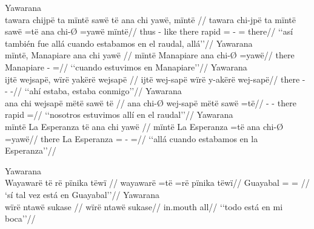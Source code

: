 \documentclass{memoir}
\begin{document}
\pex\label{loc-aff-locpred-cop-nsubj}    \a Yawarana\\
    \label{convfemgrme-99}        \begingl
        \glpreamble tawara chijpë ta mïntë sawë të ana chi yawë, mïntë //
        \gla tawara chi-jpë ta mïntë sawë =të ana chi-Ø =yawë mïntë//
        \glb thus - like there rapid =  - = there//
            \glft ‘‘así también fue allá cuando estabamos en el raudal, allá’’//  
        \endgl 
    \a Yawarana\\
    \label{convfemgrme-157}        \begingl
        \glpreamble mïntë, Manapiare ana chi yawë //
        \gla mïntë Manapiare ana chi-Ø =yawë//
        \glb there Manapiare  - =//
            \glft ‘‘cuando estuvimos en Manapiare’’//  
        \endgl 
    \a Yawarana\\
    \label{convfemgrme-292}        \begingl
        \glpreamble ijtë wejsapë, wïrë yakërë wejsapë //
        \gla ijtë wej-sapë wïrë y-akërë wej-sapë//
        \glb there -  - -//
            \glft ‘‘ahí estaba, estaba conmigo’’//  
        \endgl 
    \a Yawarana\\
    \label{histgrme-107}        \begingl
        \glpreamble ana chi wejsapë mëtë sawë të //
        \gla ana chi-Ø wej-sapë mëtë sawë =të//
        \glb {} - - there rapid =//
            \glft ‘‘nosotros estuvimos allí en el raudal’’//  
        \endgl 
    \a Yawarana\\
    \label{convamgu-127}        \begingl
        \glpreamble mïntë La Esperanza të ana chi yawë //
        \gla mïntë La Esperanza =të ana chi-Ø =yawë//
        \glb there La Esperanza =  - =//
            \glft ‘‘allá cuando estabamos en la Esperanza’’//  
        \endgl 
\xe

\pex\label{loc-aff-locpred-nsubj}    \a Yawarana\\
    \label{convamgu-80}        \begingl
        \glpreamble Wayawarë të rë pïnika tëwï //
        \gla wayawarë =të =rë pïnika tëwï//
        \glb Guayabal = =  //
            \glft ‘sí tal vez está en Guayabal’’//  
        \endgl 
    \a Yawarana\\
    \label{histyarirdi-339}        \begingl
        \glpreamble wïrë ntawë sukase //
        \gla wïrë ntawë sukase//
        \glb {} in.mouth all//
            \glft ‘‘todo está en mi boca’’//  
        \endgl 
\xe
\end{document}
